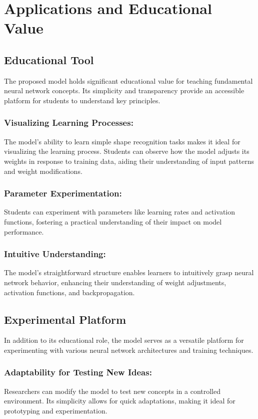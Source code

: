 \documentclass{article}
\begin{document}
\section{Applications and Educational Value}

\subsection{Educational Tool}

The proposed model holds significant educational value for teaching fundamental neural network concepts. Its simplicity and transparency provide an accessible platform for students to understand key principles.

\subsubsection*{Visualizing Learning Processes:}
The model's ability to learn simple shape recognition tasks makes it ideal for visualizing the learning process. Students can observe how the model adjusts its weights in response to training data, aiding their understanding of input patterns and weight modifications.

\subsubsection*{Parameter Experimentation:}
Students can experiment with parameters like learning rates and activation functions, fostering a practical understanding of their impact on model performance.

\subsubsection*{Intuitive Understanding:}
The model's straightforward structure enables learners to intuitively grasp neural network behavior, enhancing their understanding of weight adjustments, activation functions, and backpropagation.

\subsection{Experimental Platform}

In addition to its educational role, the model serves as a versatile platform for experimenting with various neural network architectures and training techniques.

\subsubsection*{Adaptability for Testing New Ideas:}
Researchers can modify the model to test new concepts in a controlled environment. Its simplicity allows for quick adaptations, making it ideal for prototyping and experimentation.
\end{document}
